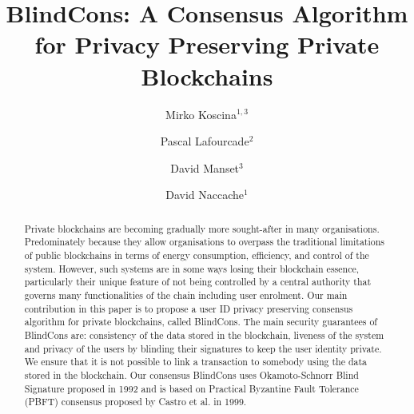 \documentclass[conference]{llncs}
\newcommand{\name}{BlindCons}
\begin{document}
\title{\name{}: A Consensus Algorithm for Privacy Preserving Private Blockchains\\}

\author{Mirko Koscina$^{1,3}$ \and Pascal Lafourcade$^2$ \and David Manset$^3$ \and David Naccache$^1$}

\maketitle


\begin{abstract}
Private blockchains are becoming gradually more sought-after in many organisations. Predominately because they allow organisations to overpass the traditional limitations of public blockchains in terms of energy consumption, efficiency, and control of the system. However, such systems are in some ways losing their blockchain essence, particularly their unique feature of not being controlled by a central authority that governs many functionalities of the chain including user enrolment. Our main contribution in this paper is to propose a user ID privacy preserving consensus algorithm for private blockchains, called BlindCons. The main security guarantees of BlindCons are: consistency of the data stored in the blockchain, liveness of the system and privacy of the users by blinding their signatures to keep the user identity private. We ensure that it is not possible to link a transaction to somebody using the data stored in the blockchain. Our consensus BlindCons uses Okamoto-Schnorr Blind Signature proposed in 1992 and is based on Practical Byzantine Fault Tolerance (PBFT) consensus proposed by Castro et al. in 1999.
\end{abstract}

\end{document}
